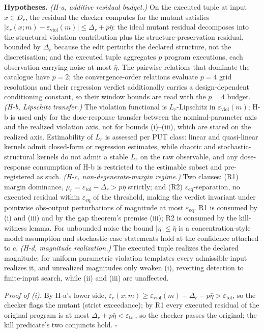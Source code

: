 \documentclass[review,12pt,authoryear]{elsarticle}
\begin{document}
\textbf{Hypotheses.} \emph{(H-a, additive residual budget.)} On the
executed tuple at input $x \in D_r$, the residual the checker computes
for the mutant satisfies
$|\varepsilon_r(x; m) - \varepsilon_{\mathrm{viol}}(m)| \leq \Delta_r + p\bar\eta$:
the ideal mutant residual decomposes into the structural violation
contribution plus the structure-preservation residual, bounded by
$\Delta_r$ because the edit perturbs the declared structure, not the
discretisation; and the executed tuple aggregates $p$ program
executions, each observation carrying noise at most $\bar\eta$. The
pairwise relations that dominate the catalogue have $p = 2$; the
convergence-order relations evaluate $p = 4$ grid resolutions and their
regression verdict additionally carries a design-dependent conditioning
constant, so their window bounds are read with the $p = 4$ budget.
\emph{(H-b, Lipschitz transfer.)} The violation functional is
$L_r$-Lipschitz in $\varepsilon_{\mathrm{viol}}(m)$; H-b is used only
for the dose-response transfer between the nominal-parameter axis and
the realized violation axis, not for bounds (i)--(iii), which are
stated on the realized axis. Estimability of $L_r$ is assessed per PUT
class: linear and quasi-linear kernels admit closed-form or regression
estimates, while chaotic and stochastic-structural kernels do not admit
a stable $L_r$ on the raw observable, and any dose-response consumption
of H-b is restricted to the estimable subset and pre-registered as
such. \emph{(H-c, non-degenerate-margin regime.)} Two clauses: (R1)
margin dominance,
$\mu_r = \varepsilon_{\mathrm{tol}} - \Delta_r > p\bar\eta$ strictly;
and (R2) $\varepsilon_{\mathrm{eq}}$-separation, no executed residual
within $\varepsilon_{\mathrm{eq}}$ of the threshold, making the verdict
invariant under pointwise obs-output perturbations of magnitude at most
$\varepsilon_{\mathrm{eq}}$. R1 is consumed by (i) and (iii) and by the
gap theorem's premise (iii); R2 is consumed by the kill-witness lemma.
For unbounded noise the bound $|\eta| \leq \bar\eta$ is a
concentration-style model assumption and stochastic-case statements
hold at the confidence attached to $c$. \emph{(H-d, magnitude
realization.)} The executed tuple realizes the declared magnitude; for
uniform parametric violation templates every admissible input realizes
it, and unrealized magnitudes only weaken (i), reverting detection to
finite-input search, while (ii) and (iii) are unaffected.

\emph{Proof of (i).} By H-a's lower side,
$\varepsilon_r(x; m) \geq \varepsilon_{\mathrm{viol}}(m) - \Delta_r - p\bar\eta > \varepsilon_{\mathrm{tol}}$,
so the checker flags the mutant (strict exceedance); by R1 every
executed residual of the original program is at most
$\Delta_r + p\bar\eta < \varepsilon_{\mathrm{tol}}$, so the checker
passes the original; the kill predicate's two conjuncts hold. $\square$
\end{document}
